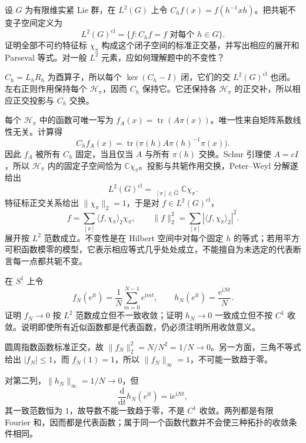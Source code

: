 \begin{exercise}\label{g1:ex:characters-class-hilbert-basis}
	设 \(G\) 为有限维实紧 Lie 群，在 \(L^2(G)\) 上令 \(C_hf(x)=f(h^{-1}xh)\)。把共轭不变子空间定义为
	\[
		L^2(G)^{\mathrm{cl}}=\{f:C_hf=f\text{ 对每个 }h\in G\}.
	\]
	证明全部不可约特征标 \(\chi_\pi\) 构成这个闭子空间的标准正交基，并写出相应的展开和 Parseval 等式。对一般 \(L^2\) 元素，应如何理解题中的不变性？
\end{exercise}
\begin{solution}
	\(C_h=L_hR_h\) 为酉算子，所以每个 \(\ker(C_h-I)\) 闭，它们的交 \(L^2(G)^{\mathrm{cl}}\) 也闭。左右正则作用保持每个 \(\mathcal H_\pi\)，因而 \(C_h\) 保持它。它还保持各 \(\mathcal H_\pi\) 的正交补，所以相应正交投影与 \(C_h\) 交换。

	每个 \(\mathcal H_\pi\) 中的函数可唯一写为 \(f_A(x)=\operatorname{tr}(A\pi(x))\)。唯一性来自矩阵系数线性无关。计算得
	\[
		C_hf_A(x)=\operatorname{tr}\bigl(\pi(h)A\pi(h)^{-1}\pi(x)\bigr).
	\]
	因此 \(f_A\) 被所有 \(C_h\) 固定，当且仅当 \(A\) 与所有 \(\pi(h)\) 交换。Schur 引理使 \(A=cI\)，所以 \(\mathcal H_\pi\) 内的固定子空间恰为 \(\mathbb C\chi_\pi\)。投影与共轭作用交换，Peter--Weyl 分解遂给出
	\[
		L^2(G)^{\mathrm{cl}}
		=\mathop{\widehat\bigoplus}_{[\pi]\in\widehat G}\mathbb C\chi_\pi.
	\]
	特征标正交关系给出 \(\|\chi_\pi\|_2=1\)，于是对 \(f\in L^2(G)^{\mathrm{cl}}\)，
	\[
		f=\sum_{[\pi]}\langle f,\chi_\pi\rangle_2\chi_\pi,
		\qquad\|f\|_2^2=\sum_{[\pi]}|\langle f,\chi_\pi\rangle_2|^2.
	\]
	展开按 \(L^2\) 范数成立。不变性是在 Hilbert 空间中对每个固定 \(h\) 的等式；若用平方可积函数模零的模型，它表示相应等式几乎处处成立，不能擅自为未选定的代表断言每一点都共轭不变。
\end{solution}

\begin{exercise}\label{g1:ex:peter-weyl-convergence-counterexamples}
	在 \(S^1\) 上令
	\[
		f_N(e^{\mathrm{i}t})=\frac1N\sum_{m=0}^{N-1}e^{\mathrm{i}mt},
		\qquad h_N(e^{\mathrm{i}t})=\frac{e^{\mathrm{i}Nt}}N.
	\]
	证明 \(f_N\to0\) 按 \(L^2\) 范数成立但不一致收敛；证明 \(h_N\to0\) 一致成立但不按 \(C^1\) 收敛。说明即使所有近似函数都是代表函数，仍必须注明所用收敛意义。
\end{exercise}
\begin{solution}
	圆周指数函数标准正交，故 \(\|f_N\|_2^2=N/N^2=1/N\to0\)。另一方面，三角不等式给出 \(|f_N|\le1\)，而 \(f_N(1)=1\)，所以 \(\|f_N\|_\infty=1\)，不可能一致趋于零。

	对第二列，\(\|h_N\|_\infty=1/N\to0\)，但
	\[
		\frac{\mathrm{d}}{\mathrm{d}t}h_N(e^{\mathrm{i}t})
		=\mathrm{i}e^{\mathrm{i}Nt},
	\]
	其一致范数恒为 \(1\)，故导数不能一致趋于零，不是 \(C^1\) 收敛。两列都是有限 Fourier 和，因而都是代表函数；属于同一个函数代数并不会使三种拓扑的收敛条件相同。
\end{solution}

